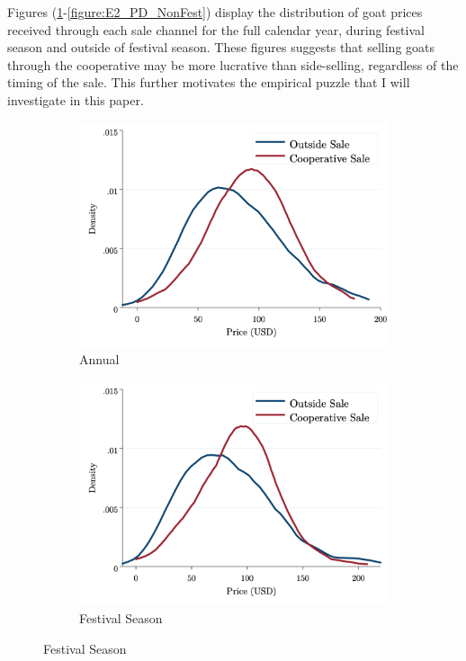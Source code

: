 \documentclass[11pt]{article}
\begin{document}
Figures (\ref{figure:E2_PD_Annual}-\ref{figure:E2_PD_NonFest}) display the distribution of goat prices received through each sale channel for the full calendar year, during festival season and outside of festival season. These figures suggests that selling goats through the cooperative may be more lucrative than side-selling, regardless of the timing of the sale. This further motivates the empirical puzzle that I will investigate in this paper. 

\begin{figure}[H]
\caption{Distribution of Goat Prices by Sale Channel (2018 Sample)}
    \centering
    \begin{subfigure}[t]{.49\textwidth}
    \centering
        \caption{Annual} \label{figure:E2_PD_Annual}
        \includegraphics[width=\linewidth,trim=4 4 4 4,clip]{E2_PriceDensity_Annual.png} 
    \end{subfigure}
    \vspace{.5cm}
    \begin{subfigure}[t]{0.49\textwidth}
        \centering
        \caption{Festival Season} \label{figure:E2_PD_Festival}
        \includegraphics[width=\linewidth,trim=4 4 4 4,clip]{E2_PriceDensity_Festival.png} 

\end{subfigure}
\end{figure}
\end{document}
